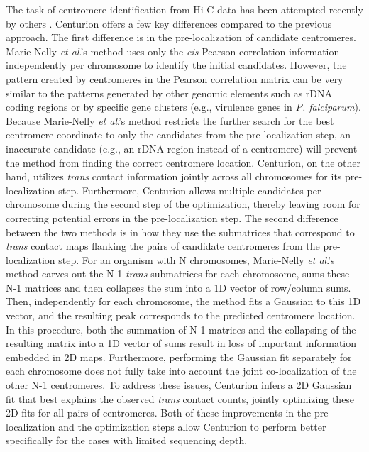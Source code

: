 The task of centromere identification from Hi-C data has been attempted
recently by others \citep{marie-nelly:filling}. Centurion offers a few key
differences compared to the previous approach. The first difference is in the
pre-localization of candidate centromeres.
Marie-Nelly \textit{et al}.'s
method uses only the \textit{cis} Pearson correlation information independently per
chromosome to identify the initial candidates. However, the pattern created by
centromeres in the Pearson correlation matrix can be very similar to the patterns
generated by other genomic elements such as rDNA coding regions or by specific
gene clusters (e.g., virulence genes in \textit{P. falciparum}). 
Because
Marie-Nelly \textit{et al}.'s method restricts
the further search for the best
centromere coordinate to only the candidates from the pre-localization step,
an inaccurate candidate (e.g., an rDNA region instead of a centromere) will
prevent the method from finding the correct centromere location. Centurion, on
the other hand, utilizes \textit{trans} contact information jointly across all
chromosomes for its pre-localization step. Furthermore, Centurion allows
multiple candidates per chromosome during the second step of the optimization,
thereby leaving room for correcting potential errors in the pre-localization
step. The second difference between the two methods is in how they use the
submatrices that correspond to \textit{trans} contact maps flanking the pairs
of candidate centromeres from the pre-localization step. For an organism with
N chromosomes, Marie-Nelly \textit{et al}.'s
method carves out the N-1
\textit{trans} submatrices for each chromosome, sums these N-1 matrices and
then collapses the sum into a 1D vector of row/column sums. Then,
independently for each chromosome, the method fits a Gaussian to this 1D
vector, and the resulting peak corresponds to the predicted centromere
location. In this procedure, both the summation of N-1 matrices and the
collapsing of the resulting matrix into a 1D vector of sums result in loss of
important information embedded in 2D maps. Furthermore, performing the
Gaussian fit separately for each chromosome does not fully take into account
the joint co-localization of the other N-1 centromeres. To address these
issues, Centurion infers a 2D Gaussian fit that best explains the observed
\textit{trans} contact counts, jointly optimizing these 2D fits for all pairs
of centromeres. Both of these improvements in the pre-localization and the
optimization steps allow Centurion to perform better specifically for the
cases with limited sequencing depth.
